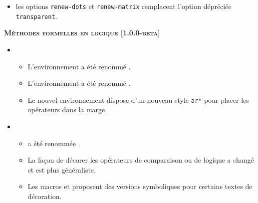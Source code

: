 \documentclass[12pt,a4paper]{book}
\begin{document}
\begin{description}
    \begin{itemize}[itemsep=.5em]
        \item {}
              les options \verb#renew-dots# et \verb#renew-matrix# remplacent l'option dépréciée \verb#transparent#.
    
    
    \end{itemize}
    
    
    \separation
    
    
    
    
    \begin{center}
        \textbf{\textsc{Méthodes formelles en logique [1.0.0-beta]}}
    \end{center}
    
    \begin{itemize}[itemsep=.5em]
        \item {}
        \begin{itemize}[itemsep=.5em]
            \item L'environnement  a été renommé .
    
            \item L'environnement  a été renommé .
    
            \item Le nouvel environnement  dispose d'un nouveau style \verb#ar*# pour placer les opérateurs dans la marge.
        \end{itemize}
    
    
        \item {}
        \begin{itemize}[itemsep=.5em]
            \item {} a été renommée .
    
            \item La façon de décorer les opérateurs de comparaison ou de logique a changé et est plus généraliste.
    
            \item Les macros  et  proposent des versions symboliques pour certains textes de décoration.
        \end{itemize}
    \end{itemize}
    

\end{description}
\end{document}
